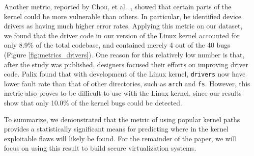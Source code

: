 Another metric, reported by Chou, et al.~\cite{PittSFIeld}, showed that certain parts of the kernel
could be more vulnerable than others. In particular, he identified device drivers as
having much higher error rates.
Applying this metric on our dataset, we found that the driver code in our version
of the Linux kernel accounted for only 8.9\% of the total codebase, and contained
merely 4 out of the 40 bugs (Figure \ref{fig:metrics_drivers}).
One reason for this relatively low number is that, after the study was published,
designers focused their efforts on improving driver code. Palix \cite{palix2011faults}
found that with development of the Linux kernel,
\texttt{drivers} now have lower fault rate than that of other directories,
such as \texttt{arch} and \texttt{fs}.
However, this metric also proves to be difficult to use with the
Linux kernel, since our results show that
only 10.0\% of the kernel bugs could be detected.

To summarize, we demonstrated that the metric of using popular
kernel paths provides a statistically significant
means for predicting where in the kernel exploitable flaws
will likely be found. For the remainder of the paper, we will
focus on using this result to build secure virtualization systems.
